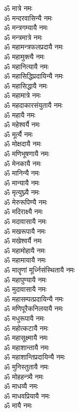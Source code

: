 \begin{flushleft}
\begin{multicols}{2}
ॐ मात्रे नमः\\
ॐ मन्दरवासिन्यै नमः\\
ॐ मन्त्रगम्यायै नमः\\
ॐ मन्त्रमात्रे नमः\\
ॐ महामन्त्रफलप्रदायै नमः\\
ॐ महामुक्त्यै नमः\\
ॐ महानित्यायै नमः\\
ॐ महासिद्धिप्रदायिन्यै नमः\\
ॐ महासिद्धायै नमः\hfill{}\\
ॐ महामात्रे नमः\\
ॐ महदाकारसंयुतायै नमः\\
ॐ महायै नमः\\
ॐ महेश्वर्यै नमः\\
ॐ मूर्त्यै नमः\\
ॐ मोक्षदायै नमः\\
ॐ मणिभूषणायै नमः\\
ॐ मेनकायै नमः\\
ॐ मानिन्यै नमः\\
ॐ मान्यायै नमः\hfill{}\\
ॐ मृत्युघ्न्यै नमः\\
ॐ मेरुरूपिण्यै नमः\\
ॐ मदिराक्ष्यै नमः\\
ॐ मदावासायै नमः\\
ॐ मखरूपायै नमः\\
ॐ मखेश्वर्यै नमः\\
ॐ महामोहायै नमः\\
ॐ महामायायै नमः\\
ॐ मातॄणां मूर्ध्निसंस्थितायै नमः\\
ॐ महापुण्यायै नमः\hfill{}\\
ॐ मुदावासायै नमः\\
ॐ महासम्पत्प्रदायिन्यै नमः\\
ॐ मणिपूरैकनिलयायै नमः\\
ॐ मधुरूपायै नमः\\
ॐ महोत्कटायै नमः\\
ॐ महासूक्ष्मायै नमः\\
ॐ महाशान्तायै नमः\\
ॐ महाशान्तिप्रदायिन्यै नमः\\
ॐ मुनिस्तुतायै नमः\\
ॐ मोहहन्त्र्यै नमः\hfill{}\\
ॐ माधव्यै नमः\\
ॐ माधवप्रियायै नमः\\
ॐ मायै नमः\\

\end{multicols}
\end{flushleft}
